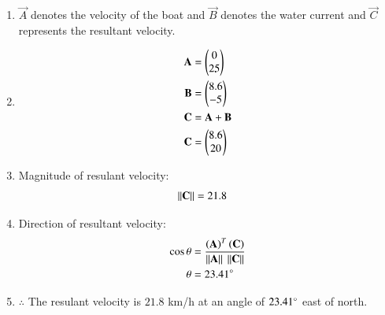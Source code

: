 \renewcommand{\theequation}{\theenumi}
\begin{enumerate}

\item \begin{flushleft}
 $\vec{A}$ denotes the velocity of the boat and $
\vec{B}$ denotes the water current and $\vec{C}$ represents the resultant velocity. 
\end{flushleft}

\item \begin{align}
\mathbf{A} &=\begin{pmatrix}0\\25\end{pmatrix} \label{eq:constr_a_motion_in_a_plane}\\
\mathbf{B} &=\begin{pmatrix}8.6\\-5\end{pmatrix} \label{eq:constr_b_motion_in_a_plane}\\
\mathbf{C} &= \mathbf{A} + \mathbf{B}\\
\mathbf{C} &= \begin{pmatrix}8.6\\20\end{pmatrix}
\end{align}

\item Magnitude of resulant velocity:
\begin{align}
\left\lVert\mathbf{C}\right\rVert &= 21.8
\end{align}

\item Direction of resultant velocity:
\begin{align}
\cos{\theta} &= \frac{\left(\mathbf{A}\right)^T\left(\mathbf{C}\right)}{\left\lVert\mathbf{A}\right\rVert\ \left\lVert\mathbf{C}\right\rVert}\\
\theta &= 23.41\degree
\end{align}

\item \begin{flushleft}
$\therefore$ The resulant velocity is $21.8$ km/h at an angle of $23.41\degree$ east of north.
\end{flushleft}


\end{enumerate}
